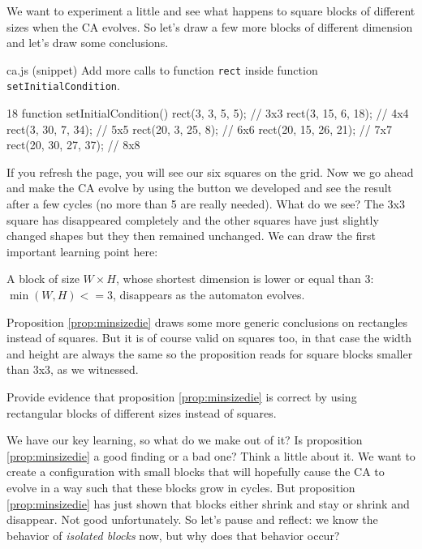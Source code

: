 We want to experiment a little and see what happens to square blocks of different sizes when
the CA evolves. So let's draw a few more blocks of different dimension and let's draw some
conclusions.

\begin{programcode}{ca.js (snippet)}
Add more calls to function \texttt{rect} inside function \texttt{setInitialCondition}.
\begin{codeh1}{1}{8}
function setInitialCondition() {
  rect(3, 3, 5, 5); // 3x3
  rect(3, 15, 6, 18); // 4x4
  rect(3, 30, 7, 34); // 5x5
  rect(20, 3, 25, 8); // 6x6
  rect(20, 15, 26, 21); // 7x7
  rect(20, 30, 27, 37); // 8x8
}
\end{codeh1}
\end{programcode}

If you refresh the page, you will see our six squares on the grid. Now we go ahead and make the
CA evolve by using the button we developed and see the result after a few cycles (no more than 5
are really needed). What do we see? The 3x3 square has disappeared completely and the other
squares have just slightly changed shapes but they then remained unchanged.
We can draw the first important learning point here:

\begin{proposition}
\label{prop:minsizedie}
A block of size $W \times H$, whose shortest dimension is lower or equal than 3: $\min(W,H) <= 3$,
disappears as the automaton evolves.
\end{proposition}

Proposition \ref{prop:minsizedie} draws some more generic conclusions on rectangles instead of squares.
But it is of course valid on squares too, in that case the width and height are always the same so
the proposition reads for square blocks smaller than 3x3, as we witnessed.

\begin{problem}
\label{prob:blocksizedie}
Provide evidence that proposition \ref{prop:minsizedie} is correct by using rectangular blocks
of different sizes instead of squares.
\end{problem}

We have our key learning, so what do we make out of it? Is proposition \ref{prop:minsizedie} a good
finding or a bad one? Think a little about it. We want to create a configuration with small blocks
that will hopefully cause the CA to evolve in a way such that these blocks grow in cycles. But
proposition \ref{prop:minsizedie} has just shown that blocks either shrink and stay or shrink and
disappear. Not good unfortunately. So let's pause and reflect: we know the behavior of
\textit{isolated blocks} now, but why does that behavior occur?

